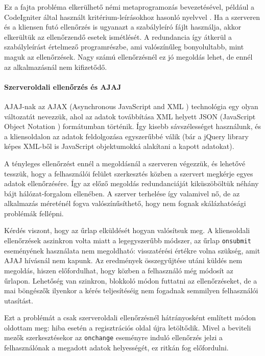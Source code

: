 \documentclass[12pt,a4paper,twoside]{article}
\begin{document}
Ez a fajta probléma elkerülhető némi metaprogramozás bevezetésével, például a
CodeIgniter által használt kritérium-leírásokhoz hasonló nyelvvel
\cite{CI-Val}. Ha a szerveren és a kliensen futó ellenőrzés is ugyanazt a
szabályleíró fájlt használja, akkor elkerültük az ellenőrzendő esetek
ismétlését. A redundancia így átkerül a szabályleírást értelmező programrészbe,
ami valószínűleg bonyolultabb, mint maguk az ellenőrzések. Nagy számú
ellenőrzésnél ez jó megoldás lehet, de ennél az alkalmazásnál nem kifizetődő.

\paragraph{Szerveroldali ellenőrzés és AJAJ}
AJAJ-nak az AJAX (Asynchronous JavaScript and XML \cite{ajax}) technológia egy
olyan változatát nevezzük, ahol az adatok továbbítása XML helyett JSON
(JavaScript Object Notation \cite{json}) formátumban történik. Így kisebb
sávszélességet használunk, és a kliensoldalon az adatok feldolgozása egyszerűbbé
válik (bár a jQuery library képes XML-ből is JavaScript objektumokká alakítani a
kapott adatokat).

A tényleges ellenőrzést ennél a megoldásnál a szerveren végezzük, és lehetővé
tesszük, hogy a felhasználói felület szerkesztés közben a szervert megkérje
egyes adatok ellenőrzésére. Így az előző megoldás redundanciáját kiküszöböltük
néhány bájt hálózat-forgalom ellenében. A szerver terhelése így valamivel nő, de
az alkalmazás méreténél fogva valószínűsíthető, hogy nem fognak
skálázhatósági problémák fellépni.

Kérdés viszont, hogy az űrlap elküldését hogyan valósítsuk meg.
A kliensoldali ellenőrzések aszinkron volta miatt a legegyszerűbb módszer, az
űrlap \texttt{onsubmit} eseményének használata nem megoldható: visszatérési
értékre volna szükség, amit AJAJ hívásnál nem kapunk. Az eredmények
összegyűjtése utáni küldés nem megoldás, hiszen előfordulhat, hogy közben a
felhasználó még módosít az űrlapon. Lehetőség van szinkron, blokkoló módon
futtatni az ellenőrzéseket, de a mai böngészők ilyenkor a kérés teljesítéséig
nem fogadnak semmilyen felhasználói utasítást.

Ezt a problémát a csak szerveroldali ellenőrzésnél hátrányosként említett módon
oldottam meg: hiba esetén a regisztrációs oldal újra letöltődik. Mivel a
beviteli mezők szerkesztésekor az \texttt{onchange} eseményre induló ellenőrzés
jelzi a felhasználónak a megadott adatok helyességét, ez ritkán fog előfordulni.
\end{document}
